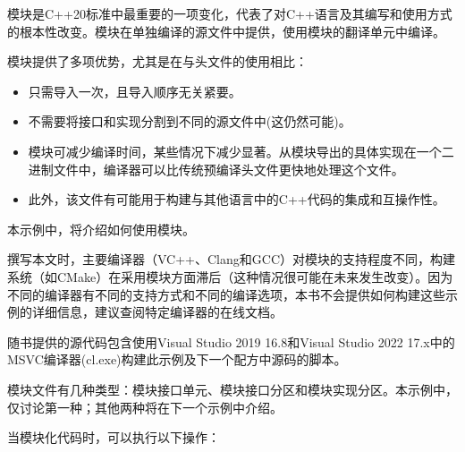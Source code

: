 
模块是C++20标准中最重要的一项变化，代表了对C++语言及其编写和使用方式的根本性改变。模块在单独编译的源文件中提供，使用模块的翻译单元中编译。

模块提供了多项优势，尤其是在与头文件的使用相比：

\begin{itemize}
\item
只需导入一次，且导入顺序无关紧要。

\item
不需要将接口和实现分割到不同的源文件中(这仍然可能)。

\item
模块可减少编译时间，某些情况下减少显著。从模块导出的具体实现在一个二进制文件中，编译器可以比传统预编译头文件更快地处理这个文件。

\item
此外，该文件有可能用于构建与其他语言中的C++代码的集成和互操作性。
\end{itemize}

本示例中，将介绍如何使用模块。


撰写本文时，主要编译器（VC++、Clang和GCC）对模块的支持程度不同，构建系统（如CMake）在采用模块方面滞后（这种情况很可能在未来发生改变）。因为不同的编译器有不同的支持方式和不同的编译选项，本书不会提供如何构建这些示例的详细信息，建议查阅特定编译器的在线文档。

\begin{myNotic}
随书提供的源代码包含使用Visual Studio 2019 16.8和Visual Studio 2022 17.x中的MSVC编译器(cl.exe)构建此示例及下一个配方中源码的脚本。
\end{myNotic}

模块文件有几种类型：模块接口单元、模块接口分区和模块实现分区。本示例中，仅讨论第一种；其他两种将在下一个示例中介绍。


当模块化代码时，可以执行以下操作：

